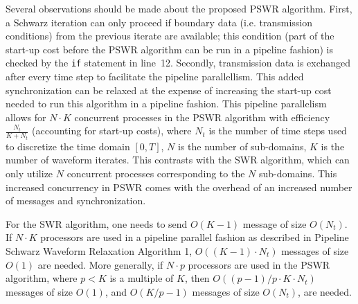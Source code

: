 \documentclass{svmult-ddm}
\begin{document}
Several observations should be made about the proposed PSWR algorithm.
First, a Schwarz iteration can only proceed if boundary data
(i.e. transmission conditions) from the previous iterate are
available; this condition (part of the start-up cost before the PSWR
algorithm can be run in a pipeline fashion) is checked by the {\tt if}
statement in line~12.  Secondly, transmission data is exchanged after
every time step to facilitate the pipeline parallellism.  This added
synchronization can be relaxed at the expense of increasing the
start-up cost needed to run this algorithm in a pipeline fashion.
This pipeline parallelism allows for $N\cdot K$ concurrent processes
in the PSWR algorithm with efficiency $\frac{N_t}{K+N_t}$ (accounting
for start-up costs), where $N_t$ is the number of time steps used to
discretize the time domain $[0,T]$, $N$ is the number of sub-domains,
$K$ is the number of waveform iterates.  This contrasts with the SWR
algorithm, which can only utilize $N$ concurrent processes
corresponding to the $N$ sub-domains.  This increased concurrency in
PSWR comes with the overhead of an increased number of messages and
synchronization.

For the SWR algorithm, one needs to send $O(K-1)$ message of size
$O(N_t)$.  If $N\cdot K$ processors are used in a pipeline parallel
fashion as described in Pipeline Schwarz Waveform Relaxation Algorithm
1, $O((K-1)\cdot N_t)$ messages of size $O(1)$ are needed.  More generally,
if $N\cdot p$ processors are used in the PSWR algorithm, where $p<K$
is a multiple of $K$, then $O((p-1)/p\cdot K\cdot N_t)$ messages of size $O(1)$,
and $O(K/p-1)$ messages of size $O(N_t)$, are needed.
%


\end{document}
